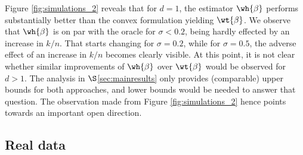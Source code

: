 \documentclass[11pt]{article}
\begin{document}
Figure \ref{fig:simulations_2} reveals that for $d = 1$, the estimator $\wh{\beta}$ performs substantially better than the convex formulation yielding $\wt{\beta}$. We observe that $\wh{\beta}$ is on par with the oracle for $\sigma < 0.2$, being hardly effected by an increase in $k/n$. That starts changing for $\sigma = 0.2$, while for $\sigma = 0.5$, the adverse effect of an increase in $k/n$ becomes clearly visible. At this point, it is not clear whether similar improvements of 
$\wh{\beta}$ over $\wt{\beta}$ would be observed for $d > 1$. The analysis in $\S$\ref{sec:mainresults} only provides (comparable) upper bounds for both approaches, and lower bounds would be needed to answer that question. The observation made from Figure \ref{fig:simulations_2} hence points towards an important open direction.      

\subsection{Real data}\label{sub:real}
\end{document}
